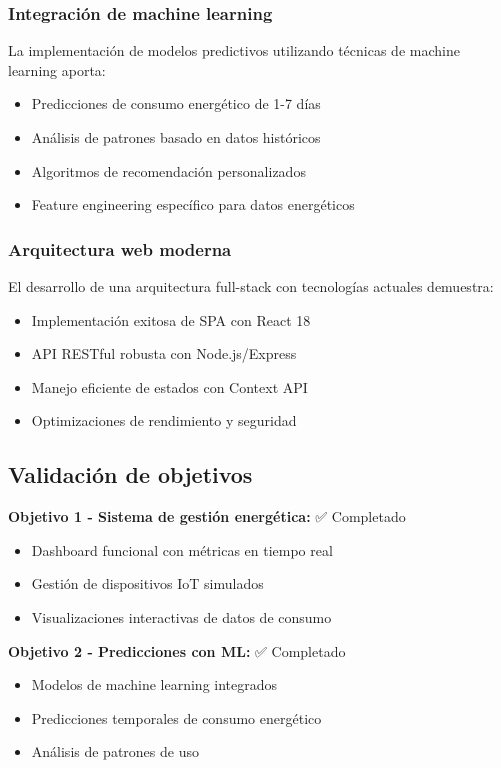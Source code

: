 \subsubsection{Integración de machine learning}

La implementación de modelos predictivos utilizando técnicas de machine learning aporta:

\begin{itemize}
    \item Predicciones de consumo energético de 1-7 días
    \item Análisis de patrones basado en datos históricos
    \item Algoritmos de recomendación personalizados
    \item Feature engineering específico para datos energéticos
\end{itemize}

\subsubsection{Arquitectura web moderna}

El desarrollo de una arquitectura full-stack con tecnologías actuales demuestra:

\begin{itemize}
    \item Implementación exitosa de SPA con React 18
    \item API RESTful robusta con Node.js/Express
    \item Manejo eficiente de estados con Context API
    \item Optimizaciones de rendimiento y seguridad
\end{itemize}

\subsection{Validación de objetivos}

\textbf{Objetivo 1 - Sistema de gestión energética:} ✅ Completado
\begin{itemize}
    \item Dashboard funcional con métricas en tiempo real
    \item Gestión de dispositivos IoT simulados
    \item Visualizaciones interactivas de datos de consumo
\end{itemize}

\textbf{Objetivo 2 - Predicciones con ML:} ✅ Completado
\begin{itemize}
    \item Modelos de machine learning integrados
    \item Predicciones temporales de consumo energético
    \item Análisis de patrones de uso
\end{itemize}

